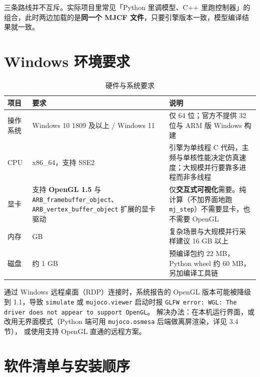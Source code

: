 \begin{note}
	三条路线并不互斥。实际项目里常见「Python 里调模型、C++ 里跑控制器」的组合，此时两边加载的是\textbf{同一个 MJCF 文件}，只要引擎版本一致，模型编译结果就一致。
\end{note}

\section{Windows 环境要求}

\begin{table}[H]
	\centering
	\caption{硬件与系统要求}
	\label{tab:MuJoCo:硬件}
	\footnotesize
	\begin{tabular}{>{\raggedright\arraybackslash}p{2.6cm}>{\raggedright\arraybackslash}p{4.2cm}>{\raggedright\arraybackslash}p{7.2cm}}
		\hline
		项目 & 要求 & 说明 \\
		\hline
		操作系统 & Windows 10 1809 及以上 / Windows 11 & 仅 64 位；官方不提供 32 位与 ARM 版 Windows 构建 \\
		CPU & x86\_64，支持 SSE2 & 引擎为单线程 C 代码，主频与单核性能决定仿真速度；大规模并行要靠多进程而非多线程 \\
		显卡 & 支持 \textbf{OpenGL 1.5} 与 \texttt{ARB\_framebuffer\_object}、\texttt{ARB\_vertex\_buffer\_object} 扩展的显卡驱动 & 仅\textbf{交互式可视化}需要。纯计算（不加界面地跑 \texttt{mj\_step}）不需要显卡，也不需要 OpenGL \\
		内存 & 8 GB & 复杂场景与大规模并行采样建议 16 GB 以上 \\
		磁盘 & 约 1 GB & 预编译包约 22 MB，Python wheel 约 60 MB，另加编译工具链 \\
		\hline
	\end{tabular}
\end{table}

\begin{warnbox}[远程桌面与虚拟机]
	通过 Windows 远程桌面（RDP）连接时，系统报告的 OpenGL 版本可能被降级到 1.1，导致 \texttt{simulate} 或 \texttt{mujoco.viewer} 启动时报
	\texttt{GLFW error: WGL: The driver does not appear to support OpenGL}。
	解决办法：在本机运行界面，或改用无界面模式（Python 端可用 \texttt{mujoco.osmesa} 后端做离屏渲染，详见 3.4 节），
	或使用支持 OpenGL 直通的远程方案。
\end{warnbox}

\section{软件清单与安装顺序}

